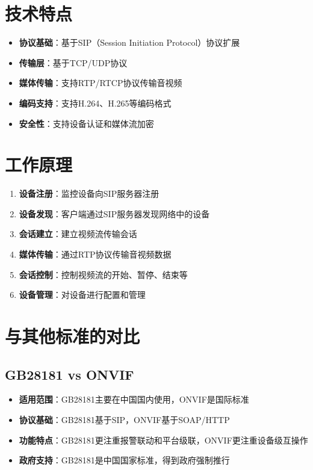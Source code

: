 \documentclass[12pt,UTF8]{ctexbook}
\begin{document}
\chapter{技术特点}

\begin{itemize}
  \item \textbf{协议基础}：基于SIP（Session Initiation Protocol）协议扩展
  \item \textbf{传输层}：基于TCP/UDP协议
  \item \textbf{媒体传输}：支持RTP/RTCP协议传输音视频
  \item \textbf{编码支持}：支持H.264、H.265等编码格式
  \item \textbf{安全性}：支持设备认证和媒体流加密
\end{itemize}

\chapter{工作原理}

\begin{enumerate}
  \item \textbf{设备注册}：监控设备向SIP服务器注册
  \item \textbf{设备发现}：客户端通过SIP服务器发现网络中的设备
  \item \textbf{会话建立}：建立视频流传输会话
  \item \textbf{媒体传输}：通过RTP协议传输音视频数据
  \item \textbf{会话控制}：控制视频流的开始、暂停、结束等
  \item \textbf{设备管理}：对设备进行配置和管理
\end{enumerate}

\chapter{与其他标准的对比}

\section{GB28181 vs ONVIF}

\begin{itemize}
  \item \textbf{适用范围}：GB28181主要在中国国内使用，ONVIF是国际标准
  \item \textbf{协议基础}：GB28181基于SIP，ONVIF基于SOAP/HTTP
  \item \textbf{功能特点}：GB28181更注重报警联动和平台级联，ONVIF更注重设备级互操作
  \item \textbf{政府支持}：GB28181是中国国家标准，得到政府强制推行
\end{itemize}
\end{document}
